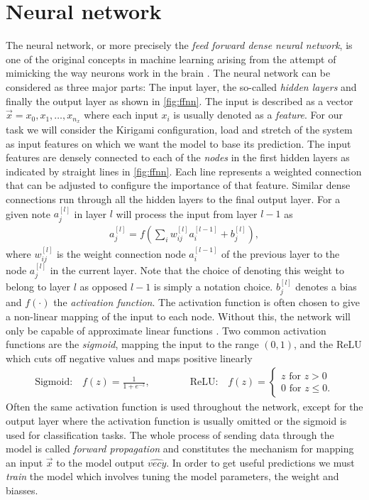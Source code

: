 \section{Neural network}
The neural network, or more precisely the \textit{feed forward dense neural
network}, is one of the original concepts in machine learning arising from the attempt of mimicking the way neurons work in the brain \cite{lederer2021activation, Shankar_2022}. The neural network can be considered as three major parts: The input layer, the
so-called \textit{hidden layers} and finally the output layer as shown in
\cref{fig:ffnn}. The input is described as a vector $\vec{x} = x_0, x_1, \ldots,
x_{n_x}$ where each input $x_i$ is usually denoted as a \textit{feature}. For
our task we will consider the Kirigami configuration, load and stretch of the system as input features on which we want the model to base its prediction. The
input features are densely connected to each of the \textit{nodes} in the first
hidden layers as indicated by straight lines in \cref{fig:ffnn}. Each line
represents a weighted connection that can be adjusted to configure the
importance of that feature. Similar dense connections run through all the
hidden layers to the final output layer. For a given note $a_j^{[l]}$ in layer $l$ will process the input from layer $l-1$ as
\begin{align*}
  a_j^{[l]} = f\left(\sum_i w^{[l]}_{ij}a_i^{[l-1]} + b_j^{[l]}\right),
\end{align*}
where $w^{[l]}_{ij}$ is the weight connection node $a_i^{[l-1]}$ of the previous layer to the node $a_j^{[l]}$ in the current layer. Note that the choice of denoting this weight to belong to layer $l$ as opposed $l-1$ is simply a notation choice. $b_j^{[l]}$ denotes a bias and $f(\cdot)$ the \textit{activation function}. The activation function is often chosen to give a non-linear mapping of the input to each node. Without this, the network will only be capable of approximate linear functions \cite{lederer2021activation}. Two common activation functions are the \textit{sigmoid}, mapping the input to the range $(0,1)$, and the ReLU which cuts off negative values and maps positive linearly
\begin{align*}
  \text{Sigmoid:} \quad f(z) = \frac{1}{1 + e^{-z}}, \qquad \qquad
  \text{ReLU:} \quad 
  f(z)= \begin{cases}
    z \text{ for } z > 0   \\
    0 \text{ for } z \leq 0.
    \end{cases}
\end{align*}
Often the same activation function is used throughout the network, except for the output layer where the activation function is usually omitted or the sigmoid is used for classification tasks. The whole process of sending data through the model is called \textit{forward propagation} and constitutes the mechanism for mapping an input $\vec{x}$ to the model output $\hat{vec{y}}$. In order to get useful predictions we must \textit{train} the model which involves tuning the model parameters, the weight and biasses.


